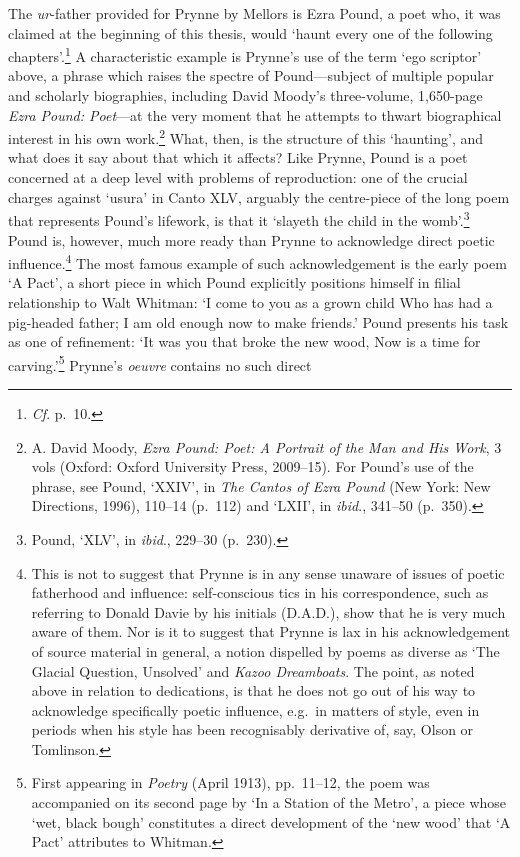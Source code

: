 \documentclass[]{article}
\begin{document}
The \emph{ur}-father provided for Prynne by Mellors is Ezra Pound, a
poet who, it was claimed at the beginning of this thesis, would `haunt
every one of the following chapters'.\footnote{\emph{Cf}. p.~10.} A
characteristic example is Prynne's use of the term `ego scriptor' above,
a phrase which raises the spectre of Pound---subject of multiple popular
and scholarly biographies, including David Moody's three-volume,
1,650-page \emph{Ezra Pound: Poet}---at the very moment that he attempts
to thwart biographical interest in his own work.\footnote{A. David
  Moody, \emph{Ezra Pound: Poet: A Portrait of the Man and His Work}, 3
  vols (Oxford: Oxford University Press, 2009--15). For Pound's use of
  the phrase, see Pound, `XXIV', in \emph{The Cantos of Ezra Pound} (New
  York: New Directions, 1996), 110--14 (p.~112) and `LXII', in
  \emph{ibid}., 341--50 (p.~350).} What, then, is the structure of this
`haunting', and what does it say about that which it affects? Like
Prynne, Pound is a poet concerned at a deep level with problems of
reproduction: one of the crucial charges against `usura' in Canto XLV,
arguably the centre-piece of the long poem that represents Pound's
lifework, is that it `slayeth the child in the womb'.\footnote{Pound,
  `XLV', in \emph{ibid}., 229--30 (p.~230).} Pound is, however, much
more ready than Prynne to acknowledge direct poetic influence.\footnote{This
  is not to suggest that Prynne is in any sense unaware of issues of
  poetic fatherhood and influence: self-conscious tics in his
  correspondence, such as referring to Donald Davie by his initials
  (D.A.D.), show that he is very much aware of them. Nor is it to
  suggest that Prynne is lax in his acknowledgement of source material
  in general, a notion dispelled by poems as diverse as `The Glacial
  Question, Unsolved' and \emph{Kazoo Dreamboats}. The point, as noted
  above in relation to dedications, is that he does not go out of his
  way to acknowledge specifically poetic influence, e.g.~in matters of
  style, even in periods when his style has been recognisably derivative
  of, say, Olson or Tomlinson.} The most famous example of such
acknowledgement is the early poem `A Pact', a short piece in which Pound
explicitly positions himself in filial relationship to Walt Whitman: `I
come to you as a grown child \textbar{} Who has had a pig-headed father;
\textbar{} I am old enough now to make friends.' Pound presents his task
as one of refinement: `It was you that broke the new wood, \textbar{}
Now is a time for carving.'\footnote{First appearing in \emph{Poetry}
  (April 1913), pp.~11--12, the poem was accompanied on its second page
  by `In a Station of the Metro', a piece whose `wet, black bough'
  constitutes a direct development of the `new wood' that `A Pact'
  attributes to Whitman.} Prynne's \emph{oeuvre} contains no such direct
\end{document}
